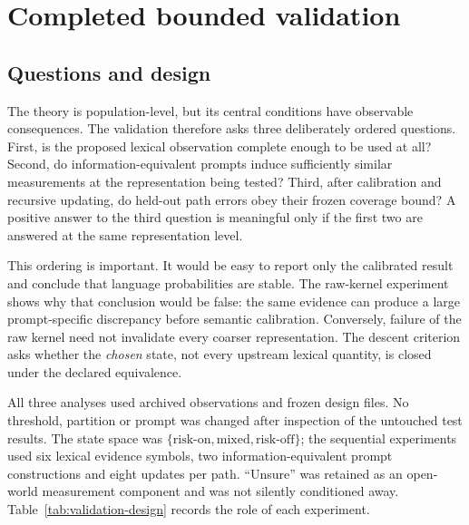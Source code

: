 \documentclass[11pt]{article}
\begin{document}
\section{Completed bounded validation}\label{sec:validation}

\subsection{Questions and design}

The theory is population-level, but its central conditions have observable
consequences.  The validation therefore asks three deliberately ordered
questions.  First, is the proposed lexical observation complete enough to be
used at all?  Second, do information-equivalent prompts induce sufficiently
similar measurements at the representation being tested?  Third, after
calibration and recursive updating, do held-out path errors obey their frozen
coverage bound?  A positive answer to the third question is meaningful only
if the first two are answered at the same representation level.

This ordering is important.  It would be easy to report only the calibrated
result and conclude that language probabilities are stable.  The raw-kernel
experiment shows why that conclusion would be false: the same evidence can
produce a large prompt-specific discrepancy before semantic calibration.
Conversely, failure of the raw kernel need not invalidate every coarser
representation.  The descent criterion asks whether the \emph{chosen} state,
not every upstream lexical quantity, is closed under the declared
equivalence.

All three analyses used archived observations and frozen design files.  No
threshold, partition or prompt was changed after inspection of the untouched
test results.  The state space was
\(\{\text{risk-on},\text{mixed},\text{risk-off}\}\); the sequential
experiments used six lexical evidence symbols, two
information-equivalent prompt constructions and eight updates per path.
``Unsure'' was retained as an open-world measurement component and was not
silently conditioned away.  Table~\ref{tab:validation-design} records the
role of each experiment.
\end{document}

